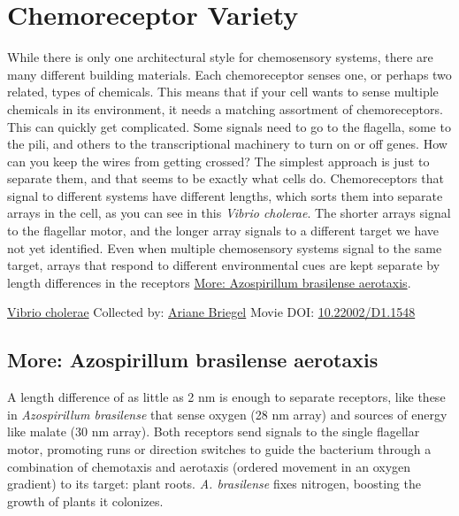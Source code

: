 \documentclass[]{tufte-book}
\begin{document}
\hypertarget{chemoreceptor-variety}{%
\section{Chemoreceptor Variety}\label{chemoreceptor-variety}}

While there is only one architectural style for chemosensory systems, there are many different building materials. Each chemoreceptor senses one, or perhaps two related, types of chemicals. This means that if your cell wants to sense multiple chemicals in its environment, it needs a matching assortment of chemoreceptors. This can quickly get complicated. Some signals need to go to the flagella, some to the pili, and others to the transcriptional machinery to turn on or off genes. How can you keep the wires from getting crossed? The simplest approach is just to separate them, and that seems to be exactly what cells do. Chemoreceptors that signal to different systems have different lengths, which sorts them into separate arrays in the cell, as you can see in this \emph{Vibrio cholerae}. The shorter arrays signal to the flagellar motor, and the longer array signals to a different target we have not yet identified. Even when multiple chemosensory systems signal to the same target, arrays that respond to different environmental cues are kept separate by length differences in the receptors \protect\hyperlink{Azospirillum_brasilense_aerotaxis}{More: Azospirillum brasilense aerotaxis}.



\hypertarget{htmlwidget-3a61b183da2aa8c9b324}{}

\label{fig:7-4}\protect\hyperlink{tree}{Vibrio cholerae} Collected by: \protect\hyperlink{ariane_briegel}{Ariane Briegel} Movie DOI: \href{https://doi.org/10.22002/D1.1548}{10.22002/D1.1548}

\hypertarget{Azospirillum_brasilense_aerotaxis}{%
\subsection*{More: Azospirillum brasilense aerotaxis}\label{Azospirillum_brasilense_aerotaxis}}

A length difference of as little as 2 nm is enough to separate receptors, like these in \emph{Azospirillum brasilense} that sense oxygen (28 nm array) and sources of energy like malate (30 nm array). Both receptors send signals to the single flagellar motor, promoting runs or direction switches to guide the bacterium through a combination of chemotaxis and aerotaxis (ordered movement in an oxygen gradient) to its target: plant roots. \emph{A. brasilense} fixes nitrogen, boosting the growth of plants it colonizes.
\end{document}
